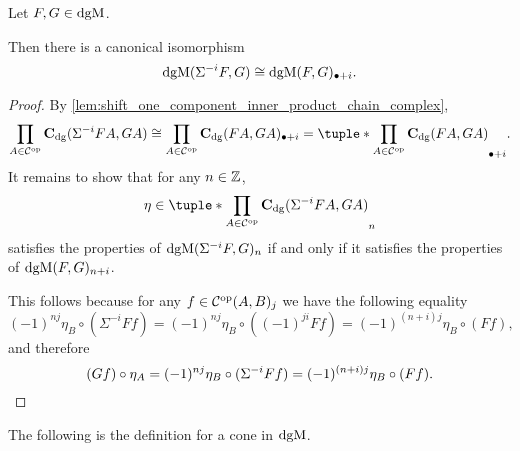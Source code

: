 \begin{lemma}
    \label{lem:dgmod_shift_eq_plus}
    Let \( F, G \in \operatorname{dgM} \).

    Then there is a canonical isomorphism
    \[
        \operatorname{dgM}(\Sigma^{-i} F, G) \cong \operatorname{dgM}(F, G)_{\bullet + i}.
    \]
\end{lemma}
\begin{proof}
    By \autoref{lem:shift_one_component_inner_product_chain_complex},
    \[
        \prod_{A \in \Cc^{\op}} \C_{\dg}(\Sigma^{-i} F A, G A) \cong \prod_{A \in \Cc^{\op}} \C_{\dg}(F A, G A)_{\bullet+i} = \tuple*{\prod_{A \in \Cc^{\op}} \C_{\dg}(F A, G A)}_{\bullet+i}.
    \]
    It remains to show that for any \( n \in {\mathbb{Z}} \),
    \[
        \eta \in \tuple*{\prod_{A \in \Cc^{\op}} \C_{\dg}(\Sigma^{-i} F A, G A)}_n
    \]
    satisfies the properties of \( \operatorname{dgM}(\Sigma^{-i} F, G)_n \) if and only if it satisfies the properties of \( \operatorname{dgM}(F, G)_{n + i} \).

    This follows because for any \( f \in {\mathcal{C}}^{\operatorname{op}}(A, B)_j \) we have the following equality
    \[
        (-1)^{nj} \eta_B \circ (\Sigma^{-i} F f) = (-1)^{nj} \eta_B \circ ((-1)^{ji}F f) = (-1)^{(n + i)j}\eta_B \circ (F f),
    \]
    and therefore
    \[
        (G f) \circ \eta_A = (-1)^{nj} \eta_B \circ (\Sigma^{-i} F f) = (-1)^{(n + i)j}\eta_B \circ (F f). \qedhere
    \]
\end{proof}

The following is the definition for a cone in \( \operatorname{dgM} \).

